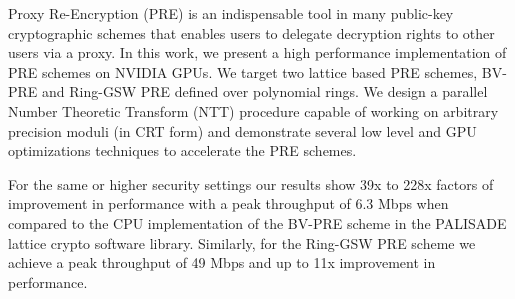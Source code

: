 Proxy Re-Encryption (PRE) is an indispensable tool in many public-key cryptographic schemes that enables users to delegate decryption rights to other users via a proxy. In this work, we present a high performance implementation of PRE schemes on NVIDIA GPUs. We target two lattice based PRE schemes, BV-PRE and Ring-GSW PRE defined over polynomial rings. We design a parallel Number Theoretic Transform (NTT) procedure capable of working on arbitrary precision moduli (in CRT form) and demonstrate several low level and GPU optimizations techniques to accelerate the PRE schemes.  

For the same or higher security settings our results show 39x to 228x factors of improvement in performance with a peak throughput of 6.3 Mbps when compared to the CPU implementation of the BV-PRE scheme in the PALISADE lattice crypto software library. Similarly, for the Ring-GSW PRE scheme we achieve a peak throughput of 49 Mbps and up to 11x improvement in performance.  